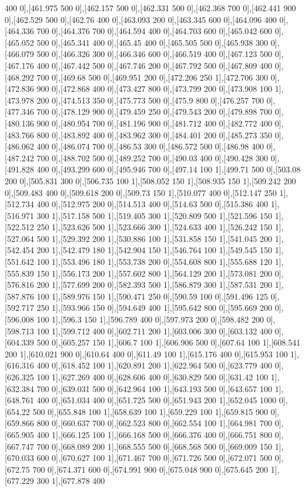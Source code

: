 {400 0],[461.975 500 0],[462.157 500 0],[462.331 500 0],[462.368 700 0],[462.441 900 0],[462.529 500 0],[462.76 400 0],[463.093 200 0],[463.345 600 0],[464.096 400 0],[464.336 700 0],[464.376 700 0],[464.594 400 0],[464.703 600 0],[465.042 600 0],[465.052 500 0],[465.341 400 0],[465.45 400 0],[465.505 500 0],[465.938 300 0],[466.079 500 0],[466.326 300 0],[466.346 600 0],[466.519 400 0],[467.123 500 0],[467.176 400 0],[467.442 500 0],[467.746 200 0],[467.792 500 0],[467.809 400 0],[468.292 700 0],[469.68 500 0],[469.951 200 0],[472.206 250 1],[472.706 300 0],[472.836 900 0],[472.868 400 0],[473.427 800 0],[473.799 200 0],[473.908 100 1],[473.978 200 0],[474.513 350 0],[475.773 500 0],[475.9 800 0],[476.257 700 0],[477.346 700 0],[478.129 900 0],[479.459 250 0],[479.543 200 0],[479.898 700 0],[480.136 900 0],[480.954 700 0],[481.196 900 0],[481.712 400 0],[482.772 400 0],[483.766 800 0],[483.892 400 0],[483.962 300 0],[484.401 200 0],[485.273 350 0],[486.062 400 0],[486.074 700 0],[486.53 300 0],[486.572 500 0],[486.98 400 0],[487.242 700 0],[488.702 500 0],[489.252 700 0],[490.03 400 0],[490.428 300 0],[491.828 400 0],[493.299 600 0],[495.946 700 0],[497.14 100 1],[499.71 500 0],[503.08 200 0],[505.831 300 0],[506.735 100 1],[508.052 150 1],[508.935 150 1],[509.242 200 0],[509.483 400 0],[509.618 200 0],[509.73 150 1],[510.077 400 0],[512.147 250 1],[512.734 400 0],[512.975 200 0],[514.513 400 0],[514.63 500 0],[515.386 400 1],[516.971 300 1],[517.158 500 1],[519.405 300 1],[520.809 500 1],[521.596 150 1],[522.512 250 1],[523.626 500 1],[523.666 300 1],[524.633 400 1],[526.242 150 1],[527.064 500 1],[529.392 200 1],[530.886 100 1],[531.858 150 1],[541.045 200 1],[542.454 200 1],[542.479 180 1],[542.904 150 1],[546.764 100 1],[549.545 150 1],[551.642 100 1],[553.496 180 1],[553.738 200 0],[554.608 800 1],[555.688 120 1],[555.839 150 1],[556.173 200 1],[557.602 800 1],[564.129 200 1],[573.081 200 0],[576.816 200 1],[577.699 200 0],[582.393 500 1],[586.879 300 1],[587.531 200 1],[587.876 100 1],[589.976 150 1],[590.471 250 0],[590.59 100 0],[591.496 125 0],[592.717 250 1],[593.966 150 0],[594.649 400 1],[595.642 800 0],[595.669 200 0],[596.008 100 1],[596.3 150 1],[596.789 400 0],[597.973 200 0],[598.482 200 0],[598.713 100 1],[599.712 400 0],[602.711 200 1],[603.006 300 0],[603.132 400 0],[604.339 500 0],[605.257 150 1],[606.7 100 1],[606.906 500 0],[607.64 100 1],[608.541 200 1],[610.021 900 0],[610.64 400 0],[611.49 100 1],[615.176 400 0],[615.953 100 1],[616.316 400 0],[618.452 100 1],[620.891 200 1],[622.964 500 0],[623.779 400 0],[626.325 100 1],[627.269 400 0],[628.606 400 0],[630.829 500 0],[631.42 100 1],[632.384 700 0],[639.031 500 0],[642.964 100 1],[643.193 500 0],[643.657 100 1],[648.761 400 0],[651.034 400 0],[651.725 500 0],[651.943 200 1],[652.045 1000 0],[654.22 500 0],[655.848 100 1],[658.639 100 1],[659.229 100 1],[659.815 900 0],[659.866 800 0],[660.637 700 0],[662.523 800 0],[662.554 100 1],[664.981 700 0],[665.905 400 1],[666.125 100 1],[666.168 500 0],[666.376 400 0],[666.751 800 0],[667.747 700 0],[668.089 200 1],[668.555 500 0],[668.568 500 0],[669.009 150 1],[670.033 600 0],[670.627 100 1],[671.467 700 0],[671.726 500 0],[672.071 500 0],[672.75 700 0],[674.371 600 0],[674.991 900 0],[675.048 900 0],[675.645 200 1],[677.229 300 1],[677.878 400 }
